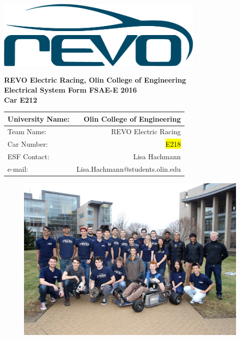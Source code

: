 \documentclass{article}
\DeclareRobustCommand{\hlr}[1]{{\sethlcolor{red}\hl{#1}}}
\begin{document}
\renewcommand{\headrulewidth}{0pt}
\chead{}
\rhead{\rightmark}
\rfoot{\thepage}

\begin{titlepage}

    \centering
    \vfill
    \includegraphics[width=10cm]{revo.png}
    
    {\bfseries\Large
        REVO Electric Racing, Olin College of Engineering\\
        \vskip2cm
        Electrical System Form FSAE-E 2016\\
        Car E212\\
    }

    \begin{table}[H]
        \centering
        \label{my-label}
        \begin{tabular}{lr}
        University Name: & Olin College of Engineering \\ \hline
        Team Name: & REVO Electric Racing \\ \hline
        Car Number: & \hlr{E218} \\ \hline
        ESF Contact: & Lisa Hachmann \\ \hline
        e-mail: & Lisa.Hachmann@students.olin.edu \\ \hline
        \end{tabular}
    \end{table}
\vfill

\begin{figure}[H]
\centering
\includegraphics[width = 0.9 \textwidth]{teamPhoto}
\end{figure}

\end{titlepage}
\end{document}
